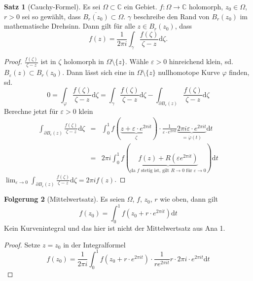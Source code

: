 \documentclass[11pt,titlepage]{article}
\theoremstyle{definition}
\newtheorem{theorem}{Satz}[section]
\newtheorem{corollary}[theorem]{Folgerung}
\theoremstyle{remark}
\begin{document}
	\begin{theorem}[Cauchy-Formel] \label{thm:CF}
		Es sei $\Omega\subset\mathbb{C}$ ein Gebiet. $f:\Omega\to\mathbb{C}$ holomorph, 
		$z_0\in\Omega$, $r>0$ sei so gewählt, dass $\overline{B_r (z_0)}\subset\Omega$. 
		$\gamma$ beschreibe den Rand von $B_r (z_0)$ im mathematische Drehsinn. Dann gilt 
		für alle $z\in B_r (z_0)$, dass 
		\[ f(z)= \frac{1}{2 \pi i} \int_{\gamma} \frac{f(\zeta)}{\zeta -z}\mathrm{d}\zeta. \]
	\end{theorem}
	
	\begin{proof}
		$\frac{f(\zeta )}{\zeta -z}$ ist in $\zeta$ holomorph in $\Omega\setminus \{ z\}$. 
		Wähle $\varepsilon >0$ hinreichend klein, sd. $B_{\varepsilon}(z)\subset B_r (z_0)$. 
		Dann lässt sich eine in $\Omega\setminus \{ z \}$ nullhomotope Kurve $\varphi$ finden, sd.
		\[ 0= \int_{\varphi} \frac{f(\zeta)}{\zeta -z}\mathrm{d}\zeta = 
		\int_{\gamma}\frac{f(\zeta)}{\zeta -z} \mathrm{d}\zeta - \int_{\partial B_{\varepsilon}(z) }
		\frac{f(\zeta)}{\zeta - z}\mathrm{d}\zeta \]
		Berechne jetzt für $\varepsilon >0$ klein 
		\begin{eqnarray*}
			\int_{\partial B_{\varepsilon}(z)} \frac{f(\zeta)}{\zeta -z}\mathrm{d}\zeta &=& 
			\int_0^1 f(\underbrace{z+\varepsilon \cdot e^{2\pi it} }_{\zeta})\cdot 
			\frac{1}{\varepsilon \cdot e^{2\pi it}} \underbrace{2\pi i \varepsilon \cdot e^{2 \pi it}}_{=
			\dot{\varphi}(t)} \mathrm{d}t \\
			&=& 2\pi i \int_0^1 f(\underbrace{f(z)+R(\varepsilon e^{2\pi i t})}_{\text{da $f$ stetig ist, gilt 
			$R\to0$ für $\varepsilon\to 0$}})\mathrm{d}t
		\end{eqnarray*}
		$\lim_{\varepsilon\to 0} \int_{\partial B_{\varepsilon} (z)} \frac{f(\zeta)}{\zeta -z} \mathrm{d}\zeta
		=2\pi i f(z)$.
	\end{proof}
	
	\begin{corollary}[Mittelwertsatz]
		Es seien $\Omega$, $f$, $z_0$, $r$ wie oben, dann gilt 
		\[ f(z_0)= \int_0^1 f(z_0+r\cdot e^{2\pi it})\mathrm{d}t \]
		Kein Kurvenintegral und das hier ist nicht der Mittelwertsatz aus Ana 1.
	\end{corollary}
	
	\begin{proof}
		Setze $z=z_0$ in der Integralformel 
		\[ f(z_0)= \frac{1}{2\pi i} \int_0^1 f(z_0+r\cdot e^{2\pi it})\cdot \frac{1}{r e^{2\pi it}} r\cdot 2\pi i \cdot 
		e^{2\pi it}\mathrm{d}t \]
	\end{proof}
	
\end{document}
